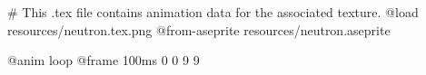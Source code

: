 # This .tex file contains animation data for the associated texture.
@load resources/neutron.tex.png
@from-aseprite resources/neutron.aseprite

@anim loop
	@frame 100ms 0 0 9 9
